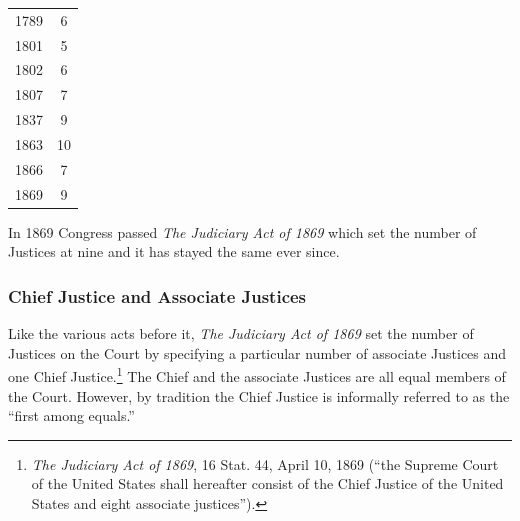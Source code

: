 \begin{center}
  \begin{tabular}{ | c | c | }
   \hline 
	\raisebox{-1.0ex}{\begin{large} \textbf{Year} \end{large}} & \raisebox{-1.0ex}{\begin{large} \textbf{Number of Justices} \end{large}} \\ [1ex] \hline
1789 & 6 \\ \hline
1801 & 5 \\ \hline
1802 & 6 \\ \hline
1807 & 7  \\ \hline
1837 & 9 \\ \hline
1863 & 10 \\ \hline
1866 & 7  \\ \hline
1869 & 9  \\ \hline
  \end{tabular}
\end{center}

In 1869 Congress passed \textit{The Judiciary Act of 1869} which set the number of Justices at nine and it has stayed the same ever since.

\subsubsection{Chief Justice and Associate Justices}
Like the various acts before it, \textit{The Judiciary Act of 1869} set the number of Justices on the Court by specifying a particular number of associate Justices and one Chief Justice.\footnote{\textit{The Judiciary Act of 1869}, 16 Stat. 44, April 10, 1869 (``the Supreme Court of the United States shall hereafter consist of the Chief Justice of the United States and eight associate justices'').}
The Chief and the associate Justices are all equal members of the Court.  However, by tradition the Chief Justice is informally referred to as the ``first among equals.''

